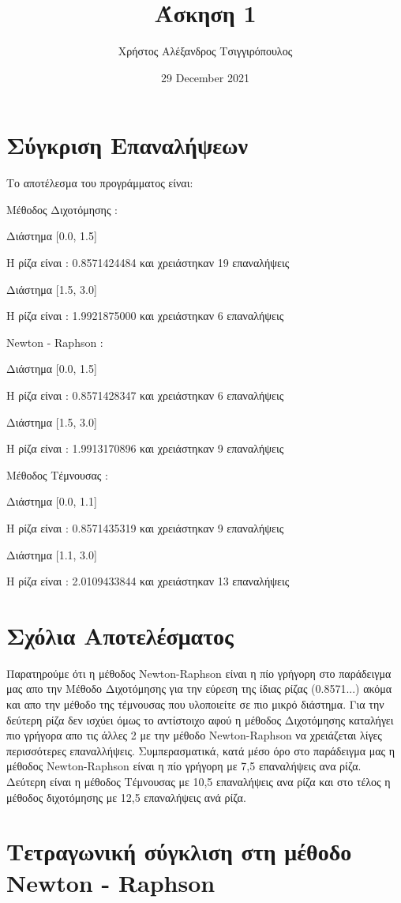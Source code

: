 \documentclass{article}
\title{Άσκηση 1}
\author{Χρήστος Αλέξανδρος Τσιγγιρόπουλος}
\date{29 December 2021}
\begin{document}
    \maketitle
    \section{Σύγκριση Επαναλήψεων}
    
    Το αποτέλεσμα του προγράμματος είναι:
    
Μέθοδος Διχοτόμησης :

Διάστημα [0.0, 1.5]

Η ρίζα είναι : 0.8571424484  και χρειάστηκαν 19  επαναλήψεις

Διάστημα [1.5, 3.0]

Η ρίζα είναι : 1.9921875000  και χρειάστηκαν 6  επαναλήψεις

Newton - Raphson    :

Διάστημα [0.0, 1.5]

Η ρίζα είναι : 0.8571428347  και χρειάστηκαν 6  επαναλήψεις

Διάστημα [1.5, 3.0]

Η ρίζα είναι : 1.9913170896  και χρειάστηκαν 9  επαναλήψεις

Μέθοδος Τέμνουσας   :

Διάστημα [0.0, 1.1]

Η ρίζα είναι : 0.8571435319  και χρειάστηκαν 9  επαναλήψεις

Διάστημα [1.1, 3.0]

Η ρίζα είναι : 2.0109433844  και χρειάστηκαν 13  επαναλήψεις
    \section{Σχόλια Αποτελέσματος}
    
    Παρατηρούμε ότι η μέθοδος Newton-Raphson είναι η πίο γρήγορη στο παράδειγμα μας απο την Μέθοδο Διχοτόμησης για την εύρεση της ίδιας ρίζας (0.8571...) ακόμα και απο την μέθοδο της τέμνουσας που υλοποιείτε σε πιο μικρό διάστημα. 
    Για την δεύτερη ρίζα δεν ισχύει όμως το αντίστοιχο αφού η μέθοδος Διχοτόμησης καταλήγει πιο γρήγορα απο τις άλλες 2 με την μέθοδο Newton-Raphson να χρειάζεται λίγες περισσότερες επαναλλήψεις.
    Συμπερασματικά, κατά μέσο όρο στο παράδειγμα μας η μέθοδος Newton-Raphson είναι η πίο γρήγορη με 7,5 επαναλήψεις ανα ρίζα.
    Δεύτερη είναι η μέθοδος Τέμνουσας με 10,5 επαναλήψεις ανα ρίζα 
    και στο τέλος η μέθοδος διχοτόμησης με 12,5 επαναλήψεις ανά ρίζα.
    \section{ Τετραγωνική σύγκλιση στη μέθοδο Newton - Raphson}
    
\end{document}
